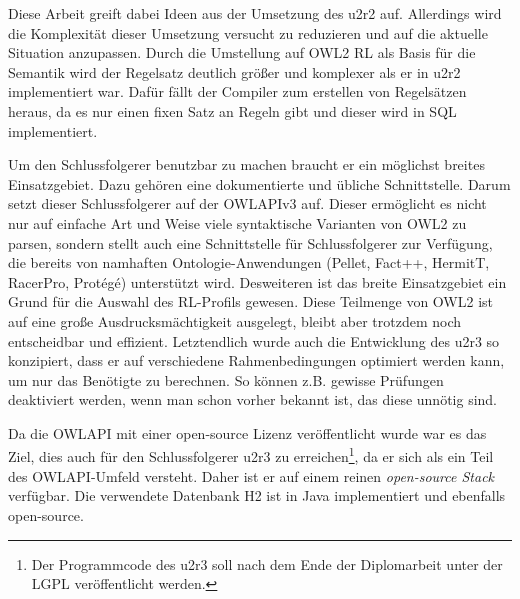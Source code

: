 Diese Arbeit greift dabei Ideen aus der Umsetzung des u2r2 \cite{Weithoehner2008} auf. Allerdings wird die Komplexität dieser Umsetzung versucht zu reduzieren und auf die aktuelle Situation anzupassen. Durch die Umstellung auf OWL2 RL als Basis für die Semantik wird der Regelsatz deutlich größer und komplexer als er in u2r2 implementiert war. Dafür fällt der Compiler zum erstellen von Regelsätzen heraus, da es nur einen fixen Satz an Regeln gibt und dieser wird in SQL implementiert.

Um den Schlussfolgerer benutzbar zu machen braucht er ein möglichst breites Einsatzgebiet. Dazu gehören eine dokumentierte und übliche Schnittstelle. Darum setzt dieser Schlussfolgerer auf der OWLAPIv3 \cite{OWLAPI} auf. Dieser ermöglicht es nicht nur auf einfache Art und Weise viele syntaktische Varianten von OWL2 zu parsen, sondern stellt auch eine Schnittstelle für Schlussfolgerer zur Verfügung, die bereits von namhaften Ontologie-Anwendungen (Pellet, Fact++, HermitT, RacerPro, Protégé) unterstützt wird. Desweiteren ist das breite Einsatzgebiet ein Grund für die Auswahl des RL-Profils gewesen. Diese Teilmenge von OWL2 ist auf eine große Ausdrucksmächtigkeit ausgelegt, bleibt aber trotzdem noch entscheidbar und effizient. Letztendlich wurde auch die Entwicklung des u2r3 so konzipiert, dass er auf verschiedene Rahmenbedingungen optimiert werden kann, um nur das Benötigte zu berechnen. So können z.B. gewisse Prüfungen deaktiviert werden, wenn man schon vorher bekannt ist, das diese unnötig sind.

Da die OWLAPI mit einer open-source Lizenz veröffentlicht wurde war es das Ziel, dies auch für den Schlussfolgerer u2r3 zu erreichen\footnote{Der Programmcode des u2r3 soll nach dem Ende der Diplomarbeit unter der LGPL veröffentlicht werden.}, da er sich als ein Teil des OWLAPI-Umfeld versteht. Daher ist er auf einem reinen \emph{open-source Stack} verfügbar. Die verwendete Datenbank H2 ist in Java implementiert und ebenfalls open-source.
